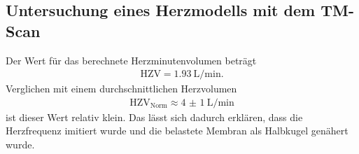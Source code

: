 \subsection{Untersuchung eines Herzmodells mit dem TM-Scan}

Der Wert für das berechnete Herzminutenvolumen beträgt
\begin{align}
  \text{HZV} = \SI{1.93}{\liter\per\minute}.
\end{align}
Verglichen mit einem durchschnittlichen Herzvolumen
\begin{align}
  \text{HZV}_\text{Norm} \approx \SI{4(1)}{\liter\per\minute}
\end{align}
ist dieser Wert relativ klein. Das lässt sich dadurch erklären, dass die
Herzfrequenz imitiert wurde und die belastete Membran als Halbkugel genähert
wurde.
